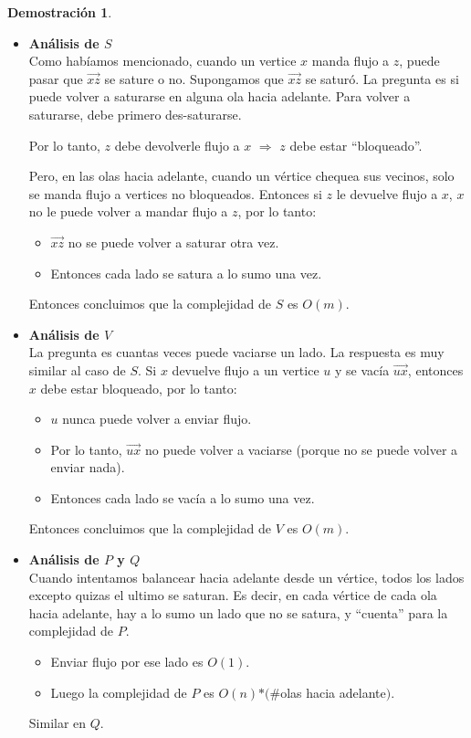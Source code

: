 \documentclass[11pt, a4paper]{article}
\theoremstyle{definition}
\newtheorem*{demostracion}{Demostración}
\begin{document}
\begin{demostracion}
    \begin{itemize}
        \item \textbf{Análisis de $S$}\\
        Como habíamos mencionado, cuando un vertice $x$ manda flujo a $z$, puede pasar que $\overrightarrow{xz}$ se sature o no. Supongamos que 
        $\overrightarrow{xz}$ se saturó. La pregunta es si puede volver a saturarse en alguna ola hacia adelante. Para volver a saturarse, debe primero
        des-saturarse.
        \begin{center}
            Por lo tanto, $z$ debe devolverle flujo a $x$ $\Rightarrow$ $z$ debe estar “bloqueado”.
        \end{center} 
        Pero, en las olas hacia adelante, cuando un vértice chequea sus vecinos, solo se manda flujo a vertices no bloqueados. Entonces si $z$ le 
        devuelve flujo a $x$, $x$ no le puede volver a mandar flujo a $z$, por lo tanto:
        \begin{itemize}
            \item $\overrightarrow{xz}$ no se puede volver a saturar otra vez.
            \item Entonces cada lado se satura a lo sumo una vez.
        \end{itemize}
        Entonces concluimos que la complejidad de $S$ es $O(m)$.
        \item \textbf{Análisis de $V$}\\
        La pregunta es cuantas veces puede vaciarse un lado. La respuesta es muy similar al caso de $S$. 
        Si $x$ devuelve flujo a un vertice $u$ y se vacía $\overrightarrow{ux}$, entonces $x$ debe estar bloqueado, por lo tanto:
        \begin{itemize}
            \item $u$ nunca puede volver a enviar flujo.
            \item Por lo tanto, $\overrightarrow{ux}$ no puede volver a vaciarse (porque no se puede volver a enviar nada).
            \item Entonces cada lado se vacía a lo sumo una vez.
        \end{itemize}
        Entonces concluimos que la complejidad de $V$ es $O(m)$.
        \item \textbf{Análisis de $P$ y $Q$}\\
        Cuando intentamos balancear hacia adelante desde un vértice,
        todos los lados excepto quizas el ultimo se saturan. Es decir, en cada vértice de
        cada ola hacia adelante, hay a lo sumo un lado que no se satura, y “cuenta” para la
        complejidad de $P$. 
        \begin{itemize}
            \item Enviar flujo por ese lado es $O(1)$. 
            \item Luego la complejidad de $P$ es $O(n)$$*$$(\#$olas hacia adelante$)$.
        \end{itemize}
        Similar en $Q$.


\end{itemize}
\end{demostracion}
\end{document}
